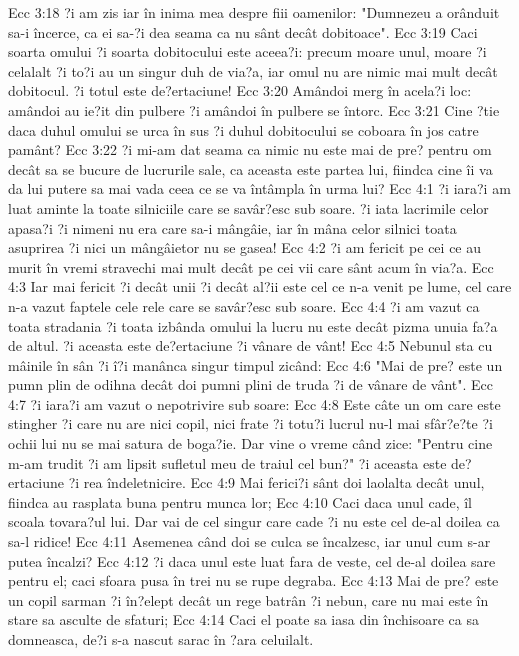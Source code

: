 Ecc 3:18  ?i am zis iar în inima mea despre fiii oamenilor: "Dumnezeu a orânduit sa-i încerce, ca ei sa-?i dea seama ca nu sânt decât dobitoace".
Ecc 3:19  Caci soarta omului ?i soarta dobitocului este aceea?i: precum moare unul, moare ?i celalalt ?i to?i au un singur duh de via?a, iar omul nu are nimic mai mult decât dobitocul. ?i totul este de?ertaciune!
Ecc 3:20  Amândoi merg în acela?i loc: amândoi au ie?it din pulbere ?i amândoi în pulbere se întorc.
Ecc 3:21  Cine ?tie daca duhul omului se urca în sus ?i duhul dobitocului se coboara în jos catre pamânt?
Ecc 3:22  ?i mi-am dat seama ca nimic nu este mai de pre? pentru om decât sa se bucure de lucrurile sale, ca aceasta este partea lui, fiindca cine îi va da lui putere sa mai vada ceea ce se va întâmpla în urma lui?
Ecc 4:1  ?i iara?i am luat aminte la toate silniciile care se savâr?esc sub soare. ?i iata lacrimile celor apasa?i ?i nimeni nu era care sa-i mângâie, iar în mâna celor silnici toata asuprirea ?i nici un mângâietor nu se gasea!
Ecc 4:2  ?i am fericit pe cei ce au murit în vremi stravechi mai mult decât pe cei vii care sânt acum în via?a.
Ecc 4:3  Iar mai fericit ?i decât unii ?i decât al?ii este cel ce n-a venit pe lume, cel care n-a vazut faptele cele rele care se savâr?esc sub soare.
Ecc 4:4  ?i am vazut ca toata stradania ?i toata izbânda omului la lucru nu este decât pizma unuia fa?a de altul. ?i aceasta este de?ertaciune ?i vânare de vânt!
Ecc 4:5  Nebunul sta cu mâinile în sân ?i î?i manânca singur timpul zicând:
Ecc 4:6  "Mai de pre? este un pumn plin de odihna decât doi pumni plini de truda ?i de vânare de vânt".
Ecc 4:7  ?i iara?i am vazut o nepotrivire sub soare:
Ecc 4:8  Este câte un om care este stingher ?i care nu are nici copil, nici frate ?i totu?i lucrul nu-l mai sfâr?e?te ?i ochii lui nu se mai satura de boga?ie. Dar vine o vreme când zice: "Pentru cine m-am trudit ?i am lipsit sufletul meu de traiul cel bun?" ?i aceasta este de?ertaciune ?i rea îndeletnicire.
Ecc 4:9  Mai ferici?i sânt doi laolalta decât unul, fiindca au rasplata buna pentru munca lor;
Ecc 4:10  Caci daca unul cade, îl scoala tovara?ul lui. Dar vai de cel singur care cade ?i nu este cel de-al doilea ca sa-l ridice!
Ecc 4:11  Asemenea când doi se culca se încalzesc, iar unul cum s-ar putea încalzi?
Ecc 4:12  ?i daca unul este luat fara de veste, cel de-al doilea sare pentru el; caci sfoara pusa în trei nu se rupe degraba.
Ecc 4:13  Mai de pre? este un copil sarman ?i în?elept decât un rege batrân ?i nebun, care nu mai este în stare sa asculte de sfaturi;
Ecc 4:14  Caci el poate sa iasa din închisoare ca sa domneasca, de?i s-a nascut sarac în ?ara celuilalt.
